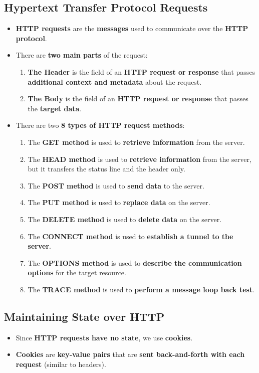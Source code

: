 \documentclass{article}
\begin{document}
    \subsection*{Hypertext Transfer Protocol Requests}
    \begin{itemize}
        \item \textbf{HTTP requests} are the \textbf{messages} used to communicate over the \textbf{HTTP protocol}.
        \item There are \textbf{two main parts} of the request:
        \begin{enumerate}
            \item \textbf{The Header} is the field of an \textbf{HTTP request or response} that passes \textbf{additional context and metadata} about the request.
            \item \textbf{The Body} is the field of an \textbf{HTTP request or response} that passes the \textbf{target data}.
        \end{enumerate}
        \item There are two \textbf{8 types of HTTP request methods}:
        \begin{enumerate}
            \item The \textbf{GET method} is used to \textbf{retrieve information} from the server.
            \item The \textbf{HEAD method} is used to \textbf{retrieve information} from the server, but it transfers the status line and the header only.
            \item The \textbf{POST method} is used to \textbf{send data} to the server.
            \item The \textbf{PUT method} is used to \textbf{replace data} on the server.
            \item The \textbf{DELETE method} is used to \textbf{delete data} on the server.
            \item The \textbf{CONNECT method} is used to \textbf{establish a tunnel to the server}.
            \item The \textbf{OPTIONS method} is used to \textbf{describe the communication options} for the target resource.
            \item The \textbf{TRACE method} is used to \textbf{perform a message loop back test}.
        \end{enumerate}
    \end{itemize}
    
    \subsection*{Maintaining State over HTTP}
    \begin{itemize}
        \item Since \textbf{HTTP requests have no state}, we use \textbf{cookies}.
        \item \textbf{Cookies} are \textbf{key-value pairs} that are \textbf{sent back-and-forth with each request} (similar to headers).
    \end{itemize}
\end{document}
